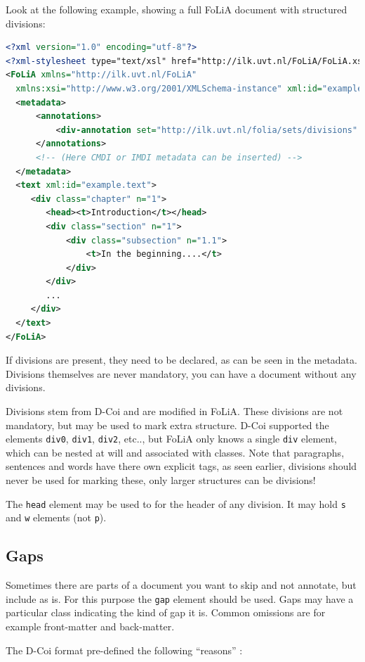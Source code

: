 \documentclass[a4paper,12pt]{report}
\begin{document}
Look at the following example, showing a full FoLiA document with structured divisions: 

\begin{lstlisting}[language=xml]
<?xml version="1.0" encoding="utf-8"?>
<?xml-stylesheet type="text/xsl" href="http://ilk.uvt.nl/FoLiA/FoLiA.xsl"?>
<FoLiA xmlns="http://ilk.uvt.nl/FoLiA"
  xmlns:xsi="http://www.w3.org/2001/XMLSchema-instance" xml:id="example">
  <metadata>
      <annotations>
          <div-annotation set="http://ilk.uvt.nl/folia/sets/divisions" />
      </annotations>    
      <!-- (Here CMDI or IMDI metadata can be inserted) -->
  </metadata>
  <text xml:id="example.text">
     <div class="chapter" n="1">
        <head><t>Introduction</t></head>
        <div class="section" n="1">
            <div class="subsection" n="1.1">
                <t>In the beginning....</t>
            </div>
        </div>
        ...
     </div>
  </text>
</FoLiA>  
\end{lstlisting}

If divisions are present, they need to be declared, as can be seen in the metadata. Divisions themselves are never mandatory, you can have a document without any divisions.

Divisions stem from D-Coi and are modified in FoLiA. These divisions are not mandatory, but may be used to mark extra structure. D-Coi supported the elements \texttt{div0}, \texttt{div1}, \texttt{div2}, etc.., but FoLiA only knows a single \texttt{div} element, which can be nested at will and associated with classes. Note that paragraphs, sentences and words have there own explicit tags, as seen earlier, divisions should never be used for marking these, only larger structures can be divisions!

The \texttt{head} element may be used to for the header of any division. It may hold \texttt{s} and \texttt{w} elements (not \texttt{p}).


\subsection{Gaps}

Sometimes there are parts of a document you want to skip and not annotate, but include as is. For this purpose the \texttt{gap} element should be used. Gaps may have a particular class indicating the kind of gap it is. Common omissions are for example front-matter and back-matter.

The D-Coi format pre-defined the following ``reasons'' \cite{DCOI}:
\end{document}
